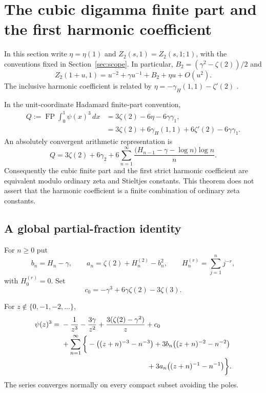 \section{The cubic digamma finite part and the first harmonic coefficient}
\label{bridge:sec}

In this section write $\eta=\eta(1)$ and $Z_2(s,1)=Z_2(s,1;1)$,
with the conventions fixed in Section~\ref{sec:scope}. In particular,
$B_2=(\gamma^2-\zeta(2))/2$ and
\[
 Z_2(1+u,1)=u^{-2}+\gamma u^{-1}+B_2+\eta u+O(u^2).
\]
The inclusive harmonic coefficient is related by
$\eta=-\gamma_H(1,1)-\zeta'(2)$ \cite{Kargin,IncomingOrdered}.

\begin{theorem}\label{bridge:main}
In the unit-coordinate Hadamard finite-part convention,
\begin{align}
 Q:=\operatorname{FP}\int_0^1\psi(x)^3\,dx
 &=3\zeta(2)-6\eta-6\gamma\gamma_1,\label{bridge:eta}\\
 &=3\zeta(2)+6\gamma_H(1,1)+6\zeta'(2)-6\gamma\gamma_1.
 \label{bridge:harmonic}
\end{align}
An absolutely convergent arithmetic representation is
\begin{equation}\label{bridge:arithmetic}
 Q=3\zeta(2)+6\gamma_2+
  6\sum_{n=1}^{\infty}
   \frac{\bigl(H_{n-1}-\gamma-\log n\bigr)\log n}{n}.
\end{equation}
Consequently the cubic finite part and the first strict harmonic
coefficient are equivalent modulo ordinary zeta and Stieltjes constants.
This theorem does not assert that the harmonic coefficient is a finite
combination of ordinary zeta constants.
\end{theorem}

\subsection{A global partial-fraction identity}

For $n\ge0$ put
\[
 b_n=H_n-\gamma,\qquad
 a_n=\zeta(2)+H_n^{(2)}-b_n^2,
 \qquad H_n^{(r)}=\sum_{j=1}^n j^{-r},
\]
with $H_0^{(r)}=0$.  Set
\[
 c_0=-\gamma^3+6\gamma\zeta(2)-3\zeta(3).
\]

\begin{lemma}
\label{bridge:ML}
For $z\notin\{0,-1,-2,\ldots\}$,
\begin{align}
 \psi(z)^3={}&-\frac1{z^3}-\frac{3\gamma}{z^2}
       +\frac{3(\zeta(2)-\gamma^2)}z+c_0\notag\\
 &+\sum_{n=1}^{\infty}\bigg\{
      -\bigl((z+n)^{-3}-n^{-3}\bigr)
      +3b_n\bigl((z+n)^{-2}-n^{-2}\bigr)\notag\\
 &\hspace{42mm}+3a_n\bigl((z+n)^{-1}-n^{-1}\bigr)\bigg\}.
 \label{bridge:MLformula}
\end{align}
The series converges normally on every compact subset avoiding the poles.
\end{lemma}

